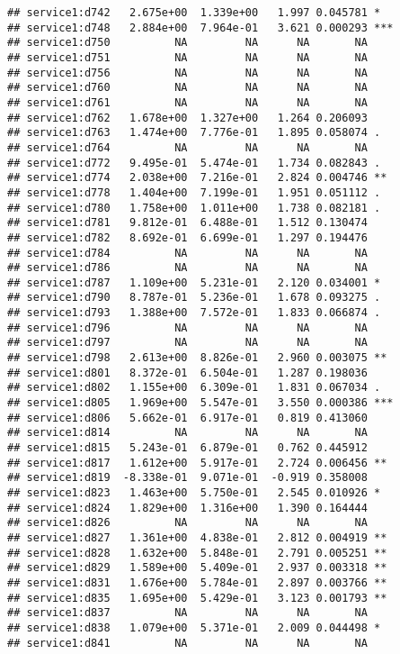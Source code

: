 \documentclass[
]{article}
\begin{document}
\begin{verbatim}
## service1:d742   2.675e+00  1.339e+00   1.997 0.045781 *  
## service1:d748   2.884e+00  7.964e-01   3.621 0.000293 ***
## service1:d750          NA         NA      NA       NA    
## service1:d751          NA         NA      NA       NA    
## service1:d756          NA         NA      NA       NA    
## service1:d760          NA         NA      NA       NA    
## service1:d761          NA         NA      NA       NA    
## service1:d762   1.678e+00  1.327e+00   1.264 0.206093    
## service1:d763   1.474e+00  7.776e-01   1.895 0.058074 .  
## service1:d764          NA         NA      NA       NA    
## service1:d772   9.495e-01  5.474e-01   1.734 0.082843 .  
## service1:d774   2.038e+00  7.216e-01   2.824 0.004746 ** 
## service1:d778   1.404e+00  7.199e-01   1.951 0.051112 .  
## service1:d780   1.758e+00  1.011e+00   1.738 0.082181 .  
## service1:d781   9.812e-01  6.488e-01   1.512 0.130474    
## service1:d782   8.692e-01  6.699e-01   1.297 0.194476    
## service1:d784          NA         NA      NA       NA    
## service1:d786          NA         NA      NA       NA    
## service1:d787   1.109e+00  5.231e-01   2.120 0.034001 *  
## service1:d790   8.787e-01  5.236e-01   1.678 0.093275 .  
## service1:d793   1.388e+00  7.572e-01   1.833 0.066874 .  
## service1:d796          NA         NA      NA       NA    
## service1:d797          NA         NA      NA       NA    
## service1:d798   2.613e+00  8.826e-01   2.960 0.003075 ** 
## service1:d801   8.372e-01  6.504e-01   1.287 0.198036    
## service1:d802   1.155e+00  6.309e-01   1.831 0.067034 .  
## service1:d805   1.969e+00  5.547e-01   3.550 0.000386 ***
## service1:d806   5.662e-01  6.917e-01   0.819 0.413060    
## service1:d814          NA         NA      NA       NA    
## service1:d815   5.243e-01  6.879e-01   0.762 0.445912    
## service1:d817   1.612e+00  5.917e-01   2.724 0.006456 ** 
## service1:d819  -8.338e-01  9.071e-01  -0.919 0.358008    
## service1:d823   1.463e+00  5.750e-01   2.545 0.010926 *  
## service1:d824   1.829e+00  1.316e+00   1.390 0.164444    
## service1:d826          NA         NA      NA       NA    
## service1:d827   1.361e+00  4.838e-01   2.812 0.004919 ** 
## service1:d828   1.632e+00  5.848e-01   2.791 0.005251 ** 
## service1:d829   1.589e+00  5.409e-01   2.937 0.003318 ** 
## service1:d831   1.676e+00  5.784e-01   2.897 0.003766 ** 
## service1:d835   1.695e+00  5.429e-01   3.123 0.001793 ** 
## service1:d837          NA         NA      NA       NA    
## service1:d838   1.079e+00  5.371e-01   2.009 0.044498 *  
## service1:d841          NA         NA      NA       NA    

\end{verbatim}
\end{document}

